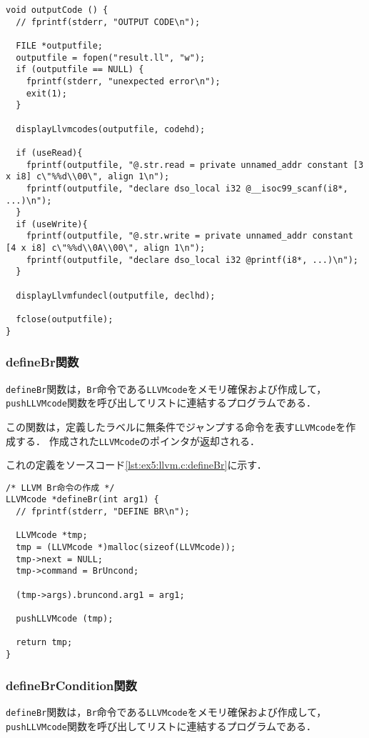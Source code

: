 \documentclass[uplatex]{jsarticle}
\begin{document}
\begin{lstlisting}[caption=outputCode関数の修正,label=lst:ex5:llvm.c:outputCode]
void outputCode () {
  // fprintf(stderr, "OUTPUT CODE\n");

  FILE *outputfile;
  outputfile = fopen("result.ll", "w");
  if (outputfile == NULL) {
    fprintf(stderr, "unexpected error\n");
    exit(1);
  }

  displayLlvmcodes(outputfile, codehd);

  if (useRead){
    fprintf(outputfile, "@.str.read = private unnamed_addr constant [3 x i8] c\"%%d\\00\", align 1\n");
    fprintf(outputfile, "declare dso_local i32 @__isoc99_scanf(i8*, ...)\n");
  }
  if (useWrite){
    fprintf(outputfile, "@.str.write = private unnamed_addr constant [4 x i8] c\"%%d\\0A\\00\", align 1\n");
    fprintf(outputfile, "declare dso_local i32 @printf(i8*, ...)\n");
  }

  displayLlvmfundecl(outputfile, declhd);

  fclose(outputfile);
}
\end{lstlisting}


\subsubsection{defineBr関数}
\verb#defineBr#関数は，\verb#Br#命令である\verb#LLVMcode#をメモリ確保および作成して，\verb#pushLLVMcode#関数を呼び出してリストに連結するプログラムである．

この関数は，定義したラベルに無条件でジャンプする命令を表す\verb#LLVMcode#を作成する．
作成された\verb#LLVMcode#のポインタが返却される．

これの定義をソースコード\ref{lst:ex5:llvm.c:defineBr}に示す．

\begin{lstlisting}[caption=defineBr関数の定義,label=lst:ex5:llvm.c:defineBr]
/* LLVM Br命令の作成 */
LLVMcode *defineBr(int arg1) {
  // fprintf(stderr, "DEFINE BR\n");

  LLVMcode *tmp;
  tmp = (LLVMcode *)malloc(sizeof(LLVMcode));
  tmp->next = NULL;
  tmp->command = BrUncond;

  (tmp->args).bruncond.arg1 = arg1;

  pushLLVMcode (tmp);

  return tmp;
}
\end{lstlisting}

\subsubsection{defineBrCondition関数}
\verb#defineBr#関数は，\verb#Br#命令である\verb#LLVMcode#をメモリ確保および作成して，\verb#pushLLVMcode#関数を呼び出してリストに連結するプログラムである．
\end{document}
